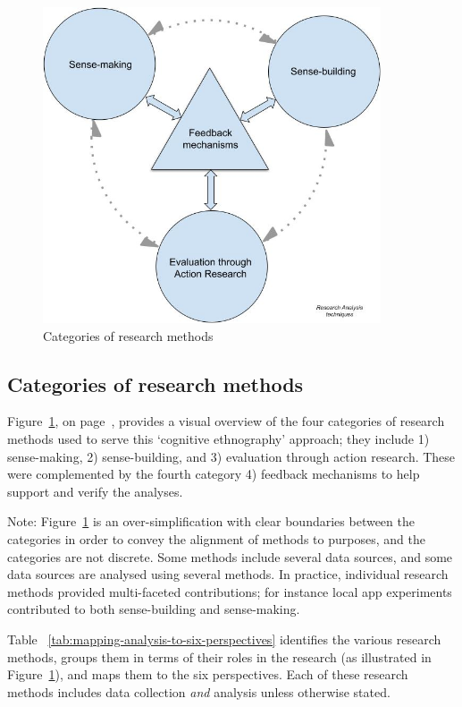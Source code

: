 \begin{figure}
    \centering
    \includegraphics[width=10cm]{images/my/analysis-techniques-in-PhD-08-Nov-2021.jpeg}
    \caption{Categories of research methods}
    \label{fig:categories-of-research-methods}
\end{figure}

\subsection{Categories of research methods}
Figure~\ref{fig:categories-of-research-methods}, on page~\pageref{fig:categories-of-research-methods}, provides a visual overview of the four categories of research methods used to serve this `cognitive ethnography' approach; they include 1) sense-making, 2) sense-building, and 3) evaluation through action research. These were complemented by the fourth category 4) feedback mechanisms to help support and verify the analyses. 

Note: Figure~\ref{fig:categories-of-research-methods} is an over-simplification with clear boundaries between the categories in order to convey the alignment of methods to purposes, and the categories are not discrete.  Some methods include several data sources, and some data sources are analysed using several methods. In practice, individual research methods provided multi-faceted contributions; for instance local app experiments contributed to both sense-building and sense-making. 


\medskip

Table ~\ref{tab:mapping-analysis-to-six-perspectives} identifies the various research methods, groups them in terms of their roles in the research (as illustrated in Figure~\ref{fig:categories-of-research-methods}), and maps them to the six perspectives.  Each of these research methods includes data collection \textit{and} analysis unless otherwise stated.



